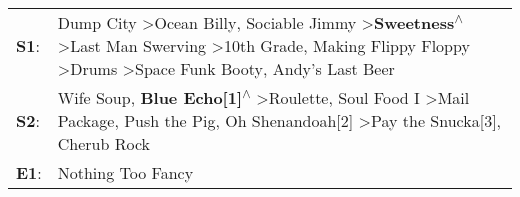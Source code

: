 \begin{supertabular}{p{0.03\textwidth}p{0.92\textwidth}}
 \textbf{S1}:  &  Dump City\textsuperscript{} \textgreater \enspace Ocean Billy\textsuperscript{}, \enspace Sociable Jimmy\textsuperscript{} \textgreater \enspace \textbf{Sweetness\textsuperscript{$\wedge$}} \textgreater \enspace Last Man Swerving\textsuperscript{} \textgreater \enspace 10th Grade\textsuperscript{}, \enspace Making Flippy Floppy\textsuperscript{} \textgreater \enspace Drums\textsuperscript{} \textgreater \enspace Space Funk Booty\textsuperscript{}, \enspace Andy's Last Beer\textsuperscript{}  \enspace  \\
 \textbf{S2}:  &                                                                                      Wife Soup\textsuperscript{}, \enspace \textbf{Blue Echo[1]\textsuperscript{$\wedge$}} \textgreater \enspace Roulette\textsuperscript{}, \enspace Soul Food I\textsuperscript{} \textgreater \enspace Mail Package\textsuperscript{}, \enspace Push the Pig\textsuperscript{}, \enspace Oh Shenandoah[2]\textsuperscript{} \textgreater \enspace Pay the Snucka[3]\textsuperscript{}, \enspace Cherub Rock\textsuperscript{}  \enspace  \\
 \textbf{E1}:  &                                                                                                                                                                                                                                                                                                                                                                                                                                                                              Nothing Too Fancy\textsuperscript{}  \enspace  \\
\end{supertabular}
